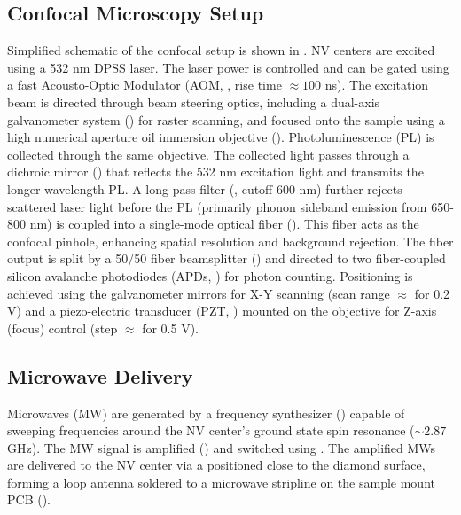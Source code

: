 \documentclass[aps,prb,twocolumn,superscriptaddress,floatfix,longbibliography,citeautoscript]{revtex4-2}
\begin{document}
\subsection{\label{sec:confocal}Confocal Microscopy Setup}
Simplified schematic of the confocal setup is shown in 
. 
NV centers are excited using a 
 532 nm DPSS laser. The laser power is controlled and can be gated using a fast Acousto-Optic Modulator (AOM, , rise time $\approx 100$ ns). The excitation beam is directed through beam steering optics, including a dual-axis galvanometer system () for raster scanning, and focused onto the sample using a high numerical aperture oil immersion objective (). 
Photoluminescence (PL) is collected through the same objective. The collected light passes through a dichroic mirror () that reflects the 532 nm excitation light and transmits the longer wavelength PL. A long-pass filter (, cutoff 600 nm) further rejects scattered laser light before the PL (primarily phonon sideband emission from 650-800 nm) is coupled into a single-mode optical fiber (). This fiber acts as the confocal pinhole, enhancing spatial resolution and background rejection. 
The fiber output is split by a 50/50 fiber beamsplitter () and directed to two fiber-coupled silicon avalanche photodiodes (APDs, ) for photon counting.
Positioning is achieved using the galvanometer mirrors for X-Y scanning (scan range $\approx$  for 0.2 V) and a piezo-electric transducer (PZT, ) mounted on the objective for Z-axis (focus) control (step $\approx$  for 0.5 V).

\subsection{\label{sec:mw}Microwave Delivery}
Microwaves (MW) are generated by a frequency synthesizer () capable of sweeping frequencies around the NV center's ground state spin resonance ($\sim 2.87$ GHz). The MW signal is amplified () and switched using . The amplified MWs are delivered to the NV center via a  positioned close to the diamond surface, forming a loop antenna soldered to a microwave stripline on the sample mount PCB ().
\end{document}
